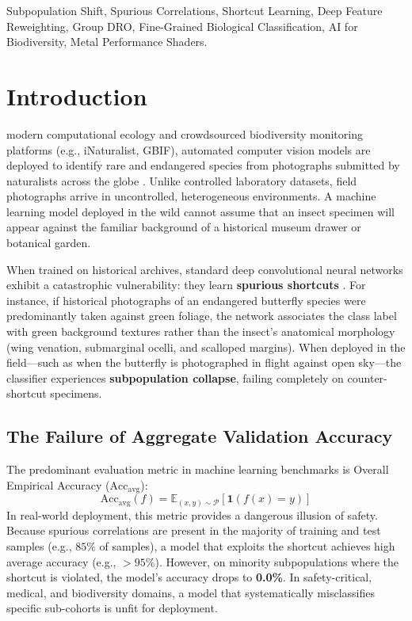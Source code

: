 \documentclass[10pt,journal,compsoc]{IEEEtran}
\begin{document}
{\begin{IEEEkeywords}
Subpopulation Shift, Spurious Correlations, Shortcut Learning, Deep Feature Reweighting, Group DRO, Fine-Grained Biological Classification, AI for Biodiversity, Metal Performance Shaders.
\end{IEEEkeywords}}

\maketitle
\IEEEdisplaynontitleabstractindextext
\IEEEpeerreviewmaketitle

\section{Introduction}

 modern computational ecology and crowdsourced biodiversity monitoring platforms (e.g., iNaturalist, GBIF), automated computer vision models are deployed to identify rare and endangered species from photographs submitted by naturalists across the globe \cite{vanhorn2018inaturalist}. Unlike controlled laboratory datasets, field photographs arrive in uncontrolled, heterogeneous environments. A machine learning model deployed in the wild cannot assume that an insect specimen will appear against the familiar background of a historical museum drawer or botanical garden.

When trained on historical archives, standard deep convolutional neural networks exhibit a catastrophic vulnerability: they learn \textbf{spurious shortcuts} \cite{geirhos2020shortcut, beery2018terraincognita}. For instance, if historical photographs of an endangered butterfly species were predominantly taken against green foliage, the network associates the class label with green background textures rather than the insect's anatomical morphology (wing venation, submarginal ocelli, and scalloped margins). When deployed in the field---such as when the butterfly is photographed in flight against open sky---the classifier experiences \textbf{subpopulation collapse}, failing completely on counter-shortcut specimens.

\subsection{The Failure of Aggregate Validation Accuracy}
The predominant evaluation metric in machine learning benchmarks is Overall Empirical Accuracy ($\text{Acc}_{\text{avg}}$):
\begin{equation}
\text{Acc}_{\text{avg}}(f) = \mathbb{E}_{(x, y) \sim \mathcal{P}} [\mathbf{1}(f(x) = y)]
\end{equation}
In real-world deployment, this metric provides a dangerous illusion of safety. Because spurious correlations are present in the majority of training and test samples (e.g., $85\%$ of samples), a model that exploits the shortcut achieves high average accuracy (e.g., $>95\%$). However, on minority subpopulations where the shortcut is violated, the model's accuracy drops to \textbf{0.0\%}. In safety-critical, medical, and biodiversity domains, a model that systematically misclassifies specific sub-cohorts is unfit for deployment.
\end{document}
